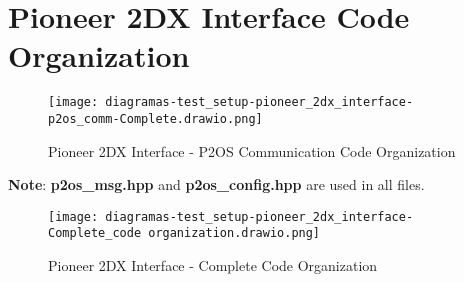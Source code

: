 \documentclass[../../monografia.tex]{subfiles}
\begin{document}
\chapter{Pioneer 2DX Interface Code Organization}
\label{ap:Pioneer 2DX Interface Code Organization}

\begin{figure}[h!]
    \caption{Pioneer 2DX Interface - P2OS Communication Code Organization}
    \centering
    \texttt{[image: diagramas-test\_setup-pioneer\_2dx\_interface-p2os\_comm-Complete.drawio.png]}
    \label{fig: Pioneer 2DX Interface - P2OS Communication Code Organization}
\end{figure}

\textbf{Note}: \textbf{p2os\_msg.hpp} and \textbf{p2os\_config.hpp} are used in all files.

\begin{figure}[h!]
    \caption{Pioneer 2DX Interface - Complete Code Organization}
    \centering
    \texttt{[image: diagramas-test\_setup-pioneer\_2dx\_interface-Complete\_code organization.drawio.png]}
    \label{fig: Pioneer 2DX Interface - Complete Code Organization}
\end{figure}
\end{document}
